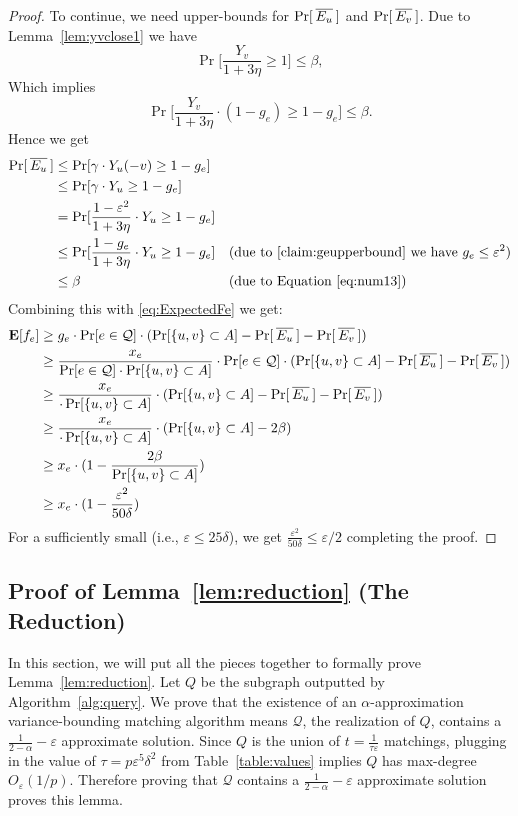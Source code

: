 \documentclass[letterpaper,11pt]{article}
\renewcommand{\epsilon}{\varepsilon}
\DeclareMathOperator{\E}{\ensuremath{\normalfont \textbf{E}}}
\newcommand{\mc}[1]{\ensuremath{\mathcal{#1}}}
\renewcommand{\epsilon}[0]{\ensuremath{\varepsilon}}
\renewcommand{\mc}[1]{\ensuremath{\mathcal{#1}}}
\begin{document}
\begin{proof}
To continue, we need upper-bounds for $\Pr[\hspace{0.2em}\overline{E_u}\hspace{0.2em}]$ and  $\Pr[\hspace{0.2em}\overline{E_v}\hspace{0.2em}]$. Due to Lemma~\ref{lem:yvclose1} we have $$\Pr\Big[\frac{Y_v}{1 + 3 \eta} \geq 1 \Big] \leq \beta,$$
Which implies
\begin{equation}\label{eq:num13}
\Pr\Big[\frac{Y_v}{1 + 3 \eta} \cdot (1 - g_e) \geq 1 - g_e \Big] \leq \beta.
\end{equation}
Hence we get
\begin{align*}
    \Pr[\Overline{E_u}] &\leq \Pr[\gamma \cdot Y_u(-v) \geq 1 - g_e] && \\
    &\leq \Pr[\gamma \cdot Y_u \geq 1 - g_e] \\
    &= \Pr[\frac{1 - \epsilon^2}{1 + 3 \eta} \cdot Y_u \geq 1 - g_e] \\
    & \leq \Pr[\frac{1 - g_e}{1 + 3 \eta} \cdot Y_u \geq 1 - g_e] && 
    \text{(due to \cref{claim:geupperbound} we have $g_e \leq \epsilon^2$)} \\
    & \leq \beta &&
    \text{(due to Equation~\ref{eq:num13})}\\
\end{align*}
Combining this with \eqref{eq:ExpectedFe} we get:
\begin{align*}
    \E[f_e] &\geq g_e \cdot \Pr[e \in \mathcal{Q}] \cdot (\Pr[\{u, v\} \subset A] - \Pr[\Overline{E_u}] - \Pr[\Overline{E_v}]) \\
    & \geq \frac{x_e}{\Pr[e \in \mathcal{Q}]\cdot\Pr[\{u, v\} \subset A]} \cdot \Pr[e \in \mathcal{Q}] \cdot (\Pr[\{u, v\} \subset A] - \Pr[\Overline{E_u}] - \Pr[\Overline{E_v}]) \\
    & \geq \frac{x_e}{\cdot\Pr[\{u, v\} \subset A]} \cdot  (\Pr[\{u, v\} \subset A] - \Pr[\Overline{E_u}] - \Pr[\Overline{E_v}]) \\
    & \geq \frac{x_e}{\cdot\Pr[\{u, v\} \subset A]} \cdot  (\Pr[\{u, v\} \subset A] - 2 \beta) \\
    & \geq x_e \cdot (1 - \frac{2\beta}{\Pr[\{u, v\} \subset A]}) \\
    & \geq x_e \cdot (1 - \frac{\epsilon^2}{50\delta})
\end{align*}
For a sufficiently small (i.e., $\epsilon\leq 25\delta$), we get $\frac{\epsilon^2}{50\delta} \leq \epsilon/2$ completing the proof. \qedhere
\end{proof}

\subsection{Proof of Lemma~\ref{lem:reduction} (The Reduction)}\label{sec:reductionproof}
In this section, we will put all the pieces together to formally prove Lemma~\ref{lem:reduction}. Let $Q$ be the subgraph outputted by Algorithm~\ref{alg:query}. 
We prove that the existence of an  $\alpha$-approximation variance-bounding matching algorithm means $\mc{Q}$, the realization of $Q$, contains a $\frac{1}{2-\alpha}-\epsilon$ approximate solution. Since $Q$ is the union of $t=\frac{1}{\tau \epsilon}$ matchings, plugging in the value of $\tau={p\epsilon^5 \delta^2}$ from Table~\ref{table:values} implies $Q$ has max-degree $O_{\epsilon}(1/p)$. Therefore proving that $\mc{Q}$ contains a $\frac{1}{2-\alpha}-\epsilon$ approximate solution proves this lemma.
\end{document}
